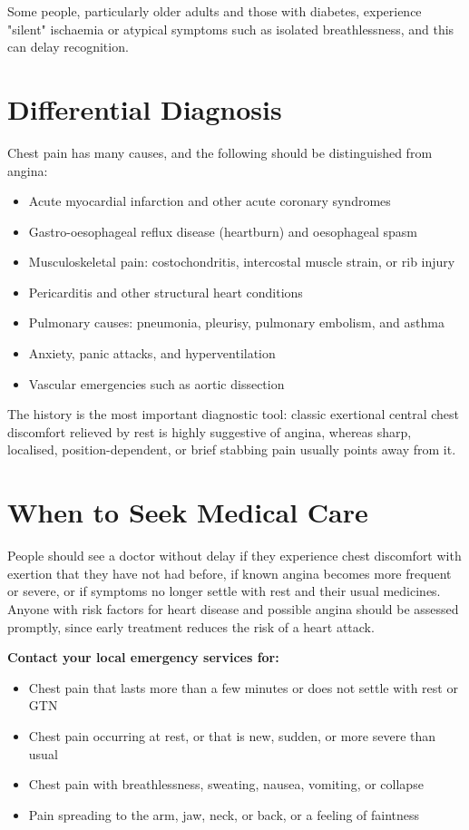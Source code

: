 Some people, particularly older adults and those with diabetes, experience "silent" ischaemia or atypical symptoms such as isolated breathlessness, and this can delay recognition.

\section*{Differential Diagnosis}
Chest pain has many causes, and the following should be distinguished from angina:

\begin{itemize}
    \item Acute myocardial infarction and other acute coronary syndromes
    \item Gastro-oesophageal reflux disease (heartburn) and oesophageal spasm
    \item Musculoskeletal pain: costochondritis, intercostal muscle strain, or rib injury
    \item Pericarditis and other structural heart conditions
    \item Pulmonary causes: pneumonia, pleurisy, pulmonary embolism, and asthma
    \item Anxiety, panic attacks, and hyperventilation
    \item Vascular emergencies such as aortic dissection
\end{itemize}

The history is the most important diagnostic tool: classic exertional central chest discomfort relieved by rest is highly suggestive of angina, whereas sharp, localised, position-dependent, or brief stabbing pain usually points away from it.

\section*{When to Seek Medical Care}
People should see a doctor without delay if they experience chest discomfort with exertion that they have not had before, if known angina becomes more frequent or severe, or if symptoms no longer settle with rest and their usual medicines. Anyone with risk factors for heart disease and possible angina should be assessed promptly, since early treatment reduces the risk of a heart attack.

\textbf{Contact your local emergency services for:}
\begin{itemize}
    \item Chest pain that lasts more than a few minutes or does not settle with rest or GTN
    \item Chest pain occurring at rest, or that is new, sudden, or more severe than usual
    \item Chest pain with breathlessness, sweating, nausea, vomiting, or collapse
    \item Pain spreading to the arm, jaw, neck, or back, or a feeling of faintness
\end{itemize}

